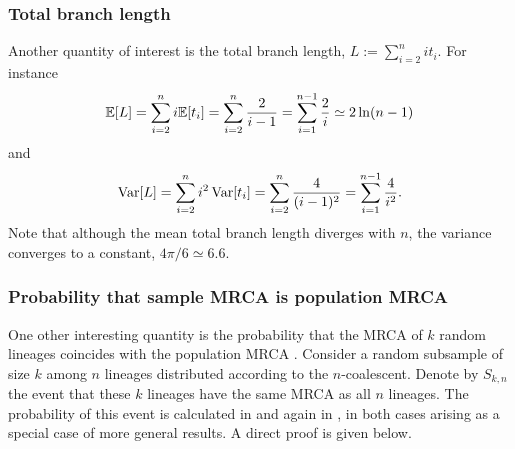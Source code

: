 \subsubsection{Total branch length}
Another quantity of interest is the total branch length,
$ L := \sum_{i=2}^n i t_i $.
For instance
\begin{equation*}
\E[ L ] 
= \sum_{i=2}^n i \E[ t_i ]
= \sum_{i=2}^n \frac{2}{i-1}
= \sum_{i=1}^{n-1} \frac{2}{i} %
\simeq 2 \ln(n-1) 
\end{equation*}
and
\begin{equation*}
\operatorname{Var}[ L ] 
= \sum_{i=2}^n i^2 \operatorname{Var}[ t_i ]
= \sum_{i=2}^n \frac{4}{(i-1)^2}
= \sum_{i=1}^{n-1} \frac{4}{i^2} .
\end{equation*}
Note that although the mean total branch length diverges with $n$, the variance converges to a constant, $4\pi /6 \simeq 6.6$.


\subsubsection{Probability that sample MRCA is population MRCA}
One other interesting quantity is the probability that the MRCA of $k$ random lineages coincides with the population MRCA \parencite[e.g.][Theorem 1.7]{durrett2008}.
Consider a random subsample of size $k$ among $n$ lineages distributed according to the $n$-coalescent.
Denote by $S_{k,n}$ the event that these $k$ lineages have the same MRCA as all $n$ lineages.
The probability of this event is calculated in \textcite[Example 1]{saunders1984} and again in \textcite[Equation (3)]{spouge2014}, in both cases arising as a special case of more general results. A direct proof is given below.

